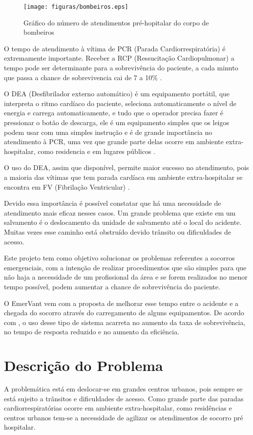  \begin{figure}[ht]
	\centering
		\texttt{[image: figuras/bombeiros.eps]}
	\caption{Gráfico do número de atendimentos pré-hopitalar do corpo de bombeiros}
\end{figure}

O tempo de atendimento à vítima de PCR (Parada Cardiorrespiratória) é extremamente importante. Receber a RCP (Ressucitação Cardiopulmonar) a tempo pode ser determinante para a sobrevivência do paciente, a cada minuto que passa a chance de sobrevivencia cai de 7 a 10\% \cite{SBC}. 

O DEA (Desfibrilador externo automático) é um equipamento portátil, que interpreta o ritmo cardíaco do paciente, seleciona automaticamente o nível de energia e carrega automaticamente, e tudo que o operador precisa fazer é pressionar o botão de descarga, ele é um equipamento simples que os leigos podem usar com uma simples instrução e é de grande importância no atendimento à PCR, uma vez que grande parte delas ocorre em ambiente extra-hospitalar, como residencia e em lugares públicos \cite{SBC}.

O uso do DEA, assim que disponível, permite maior sucesso no atendimento, pois a maioria das vítimas que tem parada cardíaca em ambiente extra-hospitalar se encontra em FV (Fibrilação Ventricular) \cite{SBC}.

Devido essa importância é possível constatar que há uma necessidade de atendimento mais eficaz nesses casos. Um grande problema que existe em um salvamento é o deslocamento da unidade de salvamento até o local do acidente. Muitas vezes esse caminho está obstruído devido trânsito ou dificuldades de acesso. 

Este projeto tem como objetivo solucionar os problemas referentes a socorros emergenciais, com a intenção de realizar procedimentos que são simples para que não haja a necessidade de um profissional da área e se forem realizados no menor tempo possível, podem aumentar a chance de sobrevivência do paciente. 

O EmerVant vem com a proposta de melhorar esse tempo entre o acidente e a chegada do socorro através do carregamento de alguns equipamentos. De acordo com \cite{DEE}, o uso desse tipo de sistema acarreta no aumento da taxa de sobrevivência, no tempo de resposta reduzido e no aumento da eficiência.

\section{Descrição do Problema}
	A problemática está em deslocar-se em grandes centros urbanos, pois sempre se está sujeito a trânsitos e dificuldades de acesso. Como grande parte das paradas cardiorrespiratórias ocorre em ambiente extra-hospitalar, como residências e centros urbanos \cite{SBC} tem-se a necessidade de agilizar os atendimentos de socorro pré hospitalar. 

